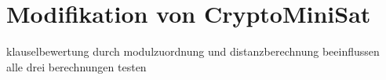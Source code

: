 \chapter{Modifikation von CryptoMiniSat}
\label{chp:modification}

klauselbewertung durch modulzuordnung und distanzberechnung beeinflussen\\
alle drei berechnungen testen




